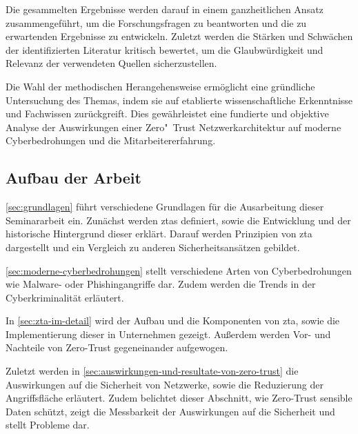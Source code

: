 Die gesammelten Ergebnisse werden darauf in einem ganzheitlichen Ansatz zusammengeführt, um die Forschungsfragen zu beantworten und die zu erwartenden Ergebnisse zu entwickeln.
Zuletzt werden die Stärken und Schwächen der identifizierten Literatur kritisch bewertet, um die Glaubwürdigkeit und Relevanz der verwendeten Quellen sicherzustellen.

Die Wahl der methodischen Herangehensweise ermöglicht eine gründliche Untersuchung des Themas, indem sie auf etablierte wissenschaftliche Erkenntnisse und Fachwissen zurückgreift.
Dies gewährleistet eine fundierte und objektive Analyse der Auswirkungen einer Zero"~Trust Netzwerkarchitektur auf moderne Cyberbedrohungen und die Mitarbeitererfahrung.

\subsection{Aufbau der Arbeit}\label{subsec:aufbau-der-arbeit}
\autoref{sec:grundlagen} führt verschiedene Grundlagen für die Ausarbeitung dieser Seminararbeit ein.
Zunächst werden \acp{zta} definiert, sowie die Entwicklung und der historische Hintergrund dieser erklärt.
Darauf werden Prinzipien von \ac{zta} dargestellt und ein Vergleich zu anderen Sicherheitsansätzen gebildet.

\autoref{sec:moderne-cyberbedrohungen} stellt verschiedene Arten von Cyberbedrohungen wie Malware- oder Phishingangriffe dar.
Zudem werden die Trends in der Cyberkriminalität erläutert.

In \autoref{sec:zta-im-detail} wird der Aufbau und die Komponenten von \ac{zta}, sowie die Implementierung dieser in Unternehmen gezeigt.
Außerdem werden Vor- und Nachteile von Zero-Trust gegeneinander aufgewogen.

Zuletzt werden in \autoref{sec:auswirkungen-und-resultate-von-zero-trust} die Auswirkungen auf die Sicherheit von Netzwerke, sowie die Reduzierung der Angriffsfläche erläutert.
Zudem belichtet dieser Abschnitt, wie Zero-Trust sensible Daten schützt, zeigt die Messbarkeit der Auswirkungen auf die Sicherheit und stellt Probleme dar.